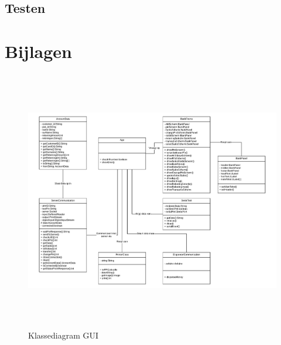 \documentclass{article}
\begin{document}

\subsection{Testen}


\newpage
\section{Bijlagen}

\begin{figure}[!h]
       \centering
       \includegraphics[height=4.5in]{Klassediagram.pdf}
       \caption{Klassediagram GUI}
       \label{fig: Klassediagram GUI}
\end{figure}
\end{document}
